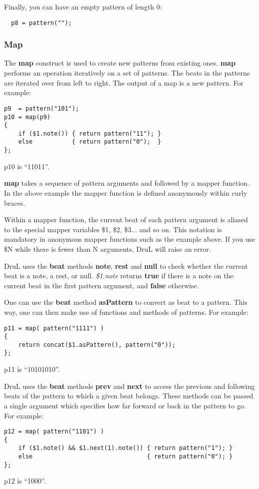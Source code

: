 Finally, you can have an empty pattern of length $0$:
\begin{verbatim}
  p8 = pattern("");
\end{verbatim}

\subsubsection{Map}\label{MapSection}

The \textbf{map} construct is used to create new patterns from existing ones.
\textbf{map} performs an operation iteratively on a set of patterns.
The beats in the patterns are iterated over from left to right.
The output of a map is a new pattern.  For example:
\begin{verbatim}
p9  = pattern("101");
p10 = map(p9)
{
    if ($1.note()) { return pattern("11"); }
    else           { return pattern("0");  }
};
\end{verbatim}
p10 is ``11011''.

\textbf{map} takes a sequence of pattern arguments and followed by a mapper function.  In the above example the mapper function is defined anonymously within curly braces.

Within a mapper function, the current beat of each pattern argument is aliased to the special mapper variables \$1, \$2, \$3... and so on.  This notation is mandatory in anonymous mapper functions such as the example above. If you use \$N while there is fewer than N arguments, DruL will raise an error.

DruL uses the \textbf{beat} methods \textbf{note}, \textbf{rest} and \textbf{null} to check whether
the current beat is a note, a rest, or null.
\textit{\$1.note} returns \textbf{true} if there is a note on the current beat in the first pattern argument, and \textbf{false} otherwise.

One can use the \textbf{beat} method \textbf{asPattern} to convert as beat to a pattern.  This way, one can then make use
of functions and methods of patterns.  For example:
\begin{verbatim}
p11 = map( pattern("1111") )
{
    return concat($1.asPattern(), pattern("0"));
};
\end{verbatim}
p11 is ``10101010''.

DruL uses the \textbf{beat} methods \textbf{prev} and \textbf{next} to access the previous and following beats of the pattern to which a given beat belongs.  These methods can be passed a single argument which specifies how far forward or back in the pattern to go.  For example:
\begin{verbatim}
p12 = map( pattern("1101") )
{
    if ($1.note() && $1.next(1).note()) { return pattern("1"); }
    else                                { return pattern("0"); }
};
\end{verbatim}
p12 is ``1000''.

